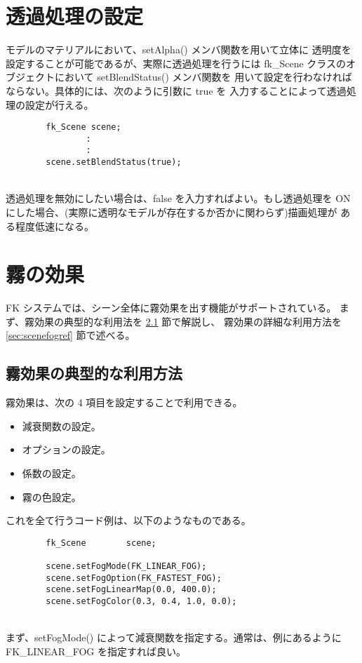\section{透過処理の設定} \label{sec:scenetrans}
モデルのマテリアルにおいて、setAlpha() メンバ関数を用いて立体に
透明度を設定することが可能であるが、実際に透過処理を行うには
fk\_Scene クラスのオブジェクトにおいて setBlendStatus() メンバ関数を
用いて設定を行わなければならない。具体的には、次のように引数に true を
入力することによって透過処理の設定が行える。
\\
\begin{screen}
\begin{verbatim}
        fk_Scene scene;
                :
                :
        scene.setBlendStatus(true);
\end{verbatim}
\end{screen}
~ \\
透過処理を無効にしたい場合は、false を入力すればよい。もし透過処理を
ON にした場合、(実際に透明なモデルが存在するか否かに関わらず)描画処理が
ある程度低速になる。

\section{霧の効果}
FK システムでは、シーン全体に霧効果を出す機能がサポートされている。
まず、霧効果の典型的な利用法を \ref{sec:scenefogintro} 節で解説し、
霧効果の詳細な利用方法を \ref{sec:scenefogref} 節で述べる。

\subsection{霧効果の典型的な利用方法} \label{sec:scenefogintro}
霧効果は、次の 4 項目を設定することで利用できる。
\begin{itemize}
 \item 減衰関数の設定。
 \item オプションの設定。
 \item 係数の設定。
 \item 霧の色設定。
\end{itemize}
これを全て行うコード例は、以下のようなものである。
\\
\begin{breakbox}
\begin{verbatim}
        fk_Scene        scene;

        scene.setFogMode(FK_LINEAR_FOG);
        scene.setFogOption(FK_FASTEST_FOG);
        scene.setFogLinearMap(0.0, 400.0);
        scene.setFogColor(0.3, 0.4, 1.0, 0.0);
\end{verbatim}
\end{breakbox}
~ \\
まず、setFogMode() によって減衰関数を指定する。通常は、例にあるように
FK\_LINEAR\_FOG を指定すれば良い。

